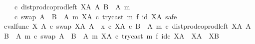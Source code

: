 \begin{isabellebody}
\ \ \ \ {\isasymcirc}\isactrlsub c\ dist{\isacharunderscore}{\kern0pt}prod{\isacharunderscore}{\kern0pt}coprod{\isacharunderscore}{\kern0pt}left\ {\isacharparenleft}{\kern0pt}X\isactrlbsup A\isactrlesup {\isacharparenright}{\kern0pt}\ A\ {\isacharparenleft}{\kern0pt}B\ {\isasymsetminus}\ {\isacharparenleft}{\kern0pt}A{\isacharcomma}{\kern0pt}\ m{\isacharparenright}{\kern0pt}{\isacharparenright}{\kern0pt}\ \isanewline
\ \ \ \ {\isasymcirc}\isactrlsub c\ swap\ {\isacharparenleft}{\kern0pt}A\ {\isasymCoprod}\ {\isacharparenleft}{\kern0pt}B\ {\isasymsetminus}\ {\isacharparenleft}{\kern0pt}A{\isacharcomma}{\kern0pt}\ m{\isacharparenright}{\kern0pt}{\isacharparenright}{\kern0pt}{\isacharparenright}{\kern0pt}\ {\isacharparenleft}{\kern0pt}X\isactrlbsup A\isactrlesup {\isacharparenright}{\kern0pt}\ {\isasymcirc}\isactrlsub c\ {\isacharparenleft}{\kern0pt}try{\isacharunderscore}{\kern0pt}cast\ m\ {\isasymtimes}\isactrlsub f\ id\ {\isacharparenleft}{\kern0pt}X\isactrlbsup A\isactrlesup {\isacharparenright}{\kern0pt}{\isacharparenright}{\kern0pt}{\isacharparenright}{\kern0pt}\isactrlsup {\isasymsharp}{\isachardoublequoteclose}{\isacharbrackright}{\kern0pt}{\isacharcomma}{\kern0pt}\ safe{\isacharparenright}{\kern0pt}\isanewline
\isanewline
\ \ \ \ \isamarkupfalse%
\ {\isachardoublequoteopen}{\isacharparenleft}{\kern0pt}{\isacharparenleft}{\kern0pt}eval{\isacharunderscore}{\kern0pt}func\ X\ A\ {\isasymcirc}\isactrlsub c\ swap\ {\isacharparenleft}{\kern0pt}X\isactrlbsup A\isactrlesup {\isacharparenright}{\kern0pt}\ A{\isacharparenright}{\kern0pt}\ {\isasymamalg}\ {\isacharparenleft}{\kern0pt}x\ {\isasymcirc}\isactrlsub c\ {\isasymbeta}\isactrlbsub X\isactrlbsup A\isactrlesup \ {\isasymtimes}\isactrlsub c\ {\isacharparenleft}{\kern0pt}B\ {\isasymsetminus}\ {\isacharparenleft}{\kern0pt}A{\isacharcomma}{\kern0pt}\ m{\isacharparenright}{\kern0pt}{\isacharparenright}{\kern0pt}\isactrlesub {\isacharparenright}{\kern0pt}\ {\isasymcirc}\isactrlsub c\ dist{\isacharunderscore}{\kern0pt}prod{\isacharunderscore}{\kern0pt}coprod{\isacharunderscore}{\kern0pt}left\ {\isacharparenleft}{\kern0pt}X\isactrlbsup A\isactrlesup {\isacharparenright}{\kern0pt}\ A\ {\isacharparenleft}{\kern0pt}B\ {\isasymsetminus}\ {\isacharparenleft}{\kern0pt}A{\isacharcomma}{\kern0pt}\ m{\isacharparenright}{\kern0pt}{\isacharparenright}{\kern0pt}\ {\isasymcirc}\isactrlsub c\ swap\ {\isacharparenleft}{\kern0pt}A\ {\isasymCoprod}\ {\isacharparenleft}{\kern0pt}B\ {\isasymsetminus}\ {\isacharparenleft}{\kern0pt}A{\isacharcomma}{\kern0pt}\ m{\isacharparenright}{\kern0pt}{\isacharparenright}{\kern0pt}{\isacharparenright}{\kern0pt}\ {\isacharparenleft}{\kern0pt}X\isactrlbsup A\isactrlesup {\isacharparenright}{\kern0pt}\ {\isasymcirc}\isactrlsub c\ try{\isacharunderscore}{\kern0pt}cast\ m\ {\isasymtimes}\isactrlsub f\ id\isactrlsub c\ {\isacharparenleft}{\kern0pt}X\isactrlbsup A\isactrlesup {\isacharparenright}{\kern0pt}{\isacharparenright}{\kern0pt}\isactrlsup {\isasymsharp}\ {\isacharcolon}{\kern0pt}\ X\isactrlbsup A\isactrlesup \ {\isasymrightarrow}\ X\isactrlbsup B\isactrlesup {\isachardoublequoteclose}\isanewline

\end{isabellebody}
